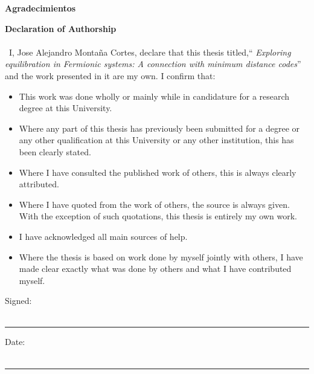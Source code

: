 \textbf{\LARGE Agradecimientos}

\newpage{}
\textbf{\LARGE Declaration of Authorship}\\\\
\
I, Jose Alejandro Montaña Cortes, declare that this thesis titled,`` \textit{Exploring equilibration in Fermionic systems: A connection with minimum distance codes}'' and the work presented in it are my own. I confirm that:

\begin{itemize} 
\item This work was done wholly or mainly while in candidature for a research degree at this University.
\item Where any part of this thesis has previously been submitted for a degree or any other qualification at this University or any other institution, this has been clearly stated.
\item Where I have consulted the published work of others, this is always clearly attributed.
\item Where I have quoted from the work of others, the source is always given. With the exception of such quotations, this thesis is entirely my own work.
\item I have acknowledged all main sources of help.
\item Where the thesis is based on work done by myself jointly with others, I have made clear exactly what was done by others and what I have contributed myself.\\
\end{itemize}
 
\noindent Signed:\\\\

\rule[0.5em]{25em}{0.5pt} %
 
\noindent Date:\\\\

\rule[0.5em]{25em}{0.5pt} %
\newpage{}